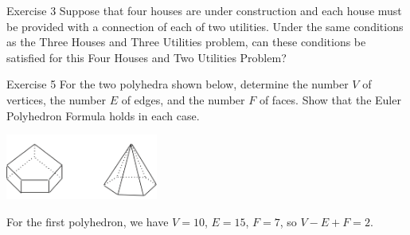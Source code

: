 \documentclass[8pt]{extarticle}
\title{}
\author{Avinash Iyer}
\date{}
\begin{document}
{
  \begin{problem}{Exercise 3}
    Suppose that four houses are under construction and each house must be provided with a connection of each of two utilities. Under the same conditions as the Three Houses and Three Utilities problem, can these conditions be satisfied for this Four Houses and Two Utilities Problem?
    \tcblower
    \begin{center}
    \end{center}
  \end{problem}
  \begin{problem}{Exercise 5}
    For the two polyhedra shown below, determine the number $V$ of vertices, the number $E$ of edges, and the number $F$ of faces. Show that the Euler Polyhedron Formula holds in each case.
    \begin{center}
      \includegraphics[width=5cm]{exercise_5}
    \end{center}
    \tcblower
    For the first polyhedron, we have $V = 10$, $E = 15$, $F = 7$, so $V-E+F = 2$.\\


\end{problem}}
\end{document}
